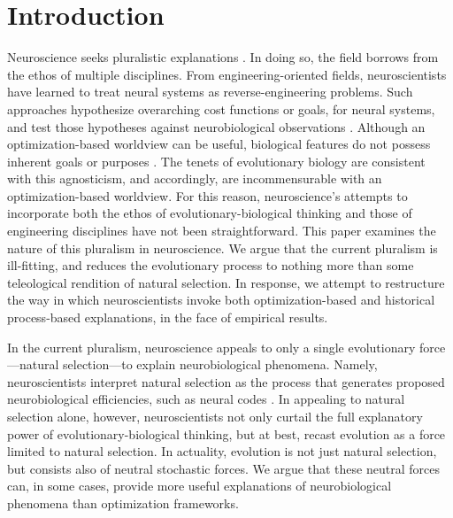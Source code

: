 \documentclass[twocolumn]{article}
\begin{document}
\section{Introduction}
Neuroscience seeks pluralistic explanations \cite{mayr_1961, tinbergen_1963, Krakauer:2017ie, hladky_2013}. In doing so, the field borrows from the ethos of multiple disciplines. From engineering-oriented fields, neuroscientists have learned to treat neural systems as reverse-engineering problems. Such approaches hypothesize overarching cost functions or goals, for neural systems, and test those hypotheses against neurobiological observations \cite{marr2010vision, Barlow_1961}.  Although an optimization-based worldview can be useful, biological features do not possess inherent goals or purposes \cite{Gould_Lewontin_1979, mayr_1997, dobzhansky_1973, Lynch_2007}. The tenets of evolutionary biology are consistent with this agnosticism, and accordingly, are incommensurable with an optimization-based worldview. For this reason, neuroscience's attempts to incorporate both the ethos of evolutionary-biological thinking and those of engineering disciplines have not been straightforward. This paper examines the nature of this pluralism in neuroscience. We argue that the current pluralism is ill-fitting, and reduces the evolutionary process to nothing more than some teleological rendition of natural selection. In response, we attempt to restructure the way in which neuroscientists invoke both optimization-based and historical process-based explanations, in the face of empirical results.   

In the current pluralism, neuroscience appeals to only a single evolutionary force---natural selection---to explain neurobiological phenomena. Namely, neuroscientists interpret natural selection as the process that generates proposed neurobiological efficiencies, such as neural codes \cite{Barlow_1961, barlow_2001, simoncelli_olshausen_2001}. In appealing to natural selection alone, however, neuroscientists not only curtail the full explanatory power of evolutionary-biological thinking, but at best, recast evolution as a force limited to natural selection. In actuality, evolution is not just natural selection, but consists also of neutral stochastic forces. We argue that these neutral forces can, in some cases, provide more useful explanations of neurobiological phenomena than optimization frameworks. 
\end{document}
